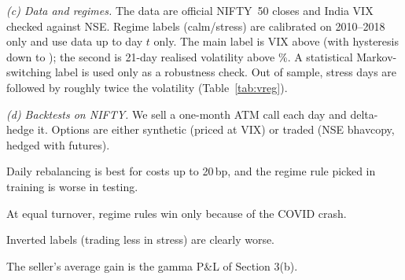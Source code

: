 \documentclass[10pt,leqno]{amsart}
\begin{document}
\noindent\emph{(c) Data and regimes.} The data are official NIFTY~50 closes and
India VIX checked against NSE. Regime labels (calm/stress) are calibrated on
2010--2018 only and use data up to day $t$ only. The main label is VIX above
\RegVixQ{} (with hysteresis down to \RegVixQlo); the second is 21-day realised
volatility above \RegRvQ\%. A statistical Markov-switching label is used only as a
robustness check. Out of sample, stress days are followed by roughly twice the
volatility (Table~\ref{tab:vreg}).

\begin{table}[h]
\centering\small

\caption{Test period: future 5-day volatility after stress / after calm [95\% CI].}
\label{tab:vreg}
\end{table}

\noindent\emph{(d) Backtests on NIFTY.} We sell a one-month ATM call each day and
delta-hedge it. Options are either synthetic (priced at VIX) or traded (NSE
bhavcopy, hedged with futures).
\begin{compactitem}
\item Daily rebalancing is best for costs up to 20\,bp, and the regime rule picked
in training is worse in testing.
\item At equal turnover, regime rules win only because of the COVID crash.
\item Inverted labels (trading less in stress) are clearly worse.
\item The seller's average gain is the gamma P\&L of Section 3(b).
\end{compactitem}

\begin{table}[h]
\centering\small

\caption{Traded-option backtest (test period).}
\end{table}
\end{document}
